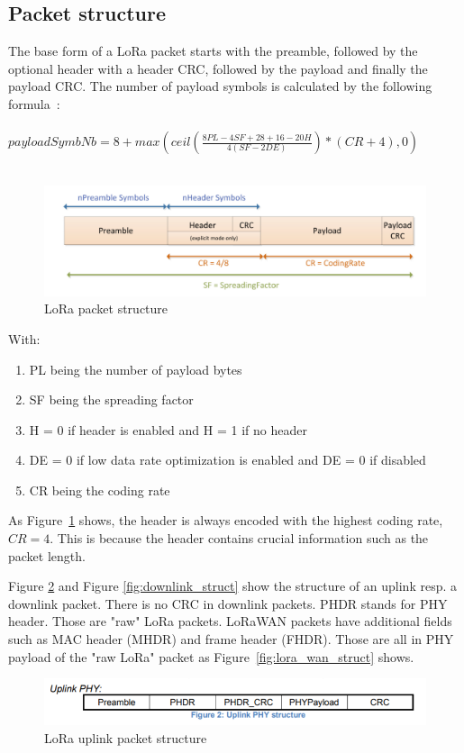 \subsection{Packet structure}
The base form of a LoRa packet starts with the preamble, followed by the optional header with a header CRC, followed by the payload and finally the 
payload CRC. The number of payload symbols is calculated by the following formula~\cite{SX_design_guide}:\\ \\
$payloadSymbNb = 8 + max{(ceil(\frac{8PL-4SF+28+16-20H}{4(SF-2DE)})*(CR+4),0)}$ 
\\ \\

\begin{figure}[h]
    \centering
    \includegraphics[width=1\textwidth]{figures/packet_struct.png}
    \caption{LoRa packet structure~\cite{SX_design_guide}}
    \label{fig:packet_struct}
\end{figure}

With: 
\begin{enumerate}
    \item PL being the number of payload bytes
    \item SF being the spreading factor
    \item H = 0 if header is enabled and H = 1 if no header
    \item DE = 0 if low data rate optimization is enabled and DE = 0 if disabled
    \item CR being the coding rate
    
\end{enumerate}

As Figure~\ref{fig:packet_struct} shows, the header is always encoded with the highest coding rate, $CR=4$.
This is because the header contains crucial information such as the packet length.

Figure \ref{fig:uplink_struct} and Figure \ref{fig:downlink_struct} show the structure of an uplink resp. a 
downlink packet. There is no CRC in downlink packets. PHDR stands for PHY header.
Those are "raw" LoRa packets. LoRaWAN packets have additional fields such as MAC header (MHDR) and 
frame header (FHDR). Those are all in PHY payload of the "raw LoRa" packet as Figure~\ref{fig:lora_wan_struct} 
shows.   
\begin{figure}[h]
    \centering
    \includegraphics[width=1\textwidth]{figures/uplink_struct.png}
    \caption{LoRa uplink packet structure~\cite{lora_wan_spec}}
    \label{fig:uplink_struct}
\end{figure}


